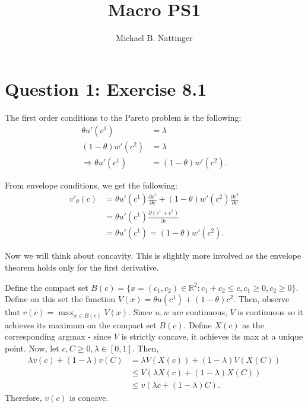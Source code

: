 \documentclass[11pt]{article} %
\title{Macro PS1}
\author{Michael B. Nattinger}
\begin{document}
\maketitle
\section{Question 1: Exercise 8.1}
The first order conditions to the Pareto problem is the following:
\begin{align*}
\theta u'(c^1) &= \lambda\\
(1-\theta)w'(c^2) &= \lambda\\
\Rightarrow \theta u'(c^1) &= (1-\theta)w'(c^2) .
\end{align*}

From envelope conditions, we get the following:
\begin{align*}
v'_{\theta}(c) &= \theta u'(c^1) \frac{\partial  c^1}{\partial c} + (1-\theta)w'(c^2)  \frac{\partial  c^2}{\partial c} \\
&= \theta u'(c^1) \frac{\partial  (c^1+c^2)}{\partial c}\\
&= \theta u'(c^1) = (1-\theta)w'(c^2) .
\end{align*}

Now we will think about concavity. This is slightly more involved as the envelope theorem holds only for the first derivative.

Define the compact set $B(c) = \{x= (c_1,c_2) \in \mathbb{R}^2: c_1+c_2\leq c, c_1\geq 0, c_2\geq 0\}$. Define on this set the function $V(x) = \theta u(c^1) + (1-\theta)c^2$. Then, observe that $v(c) = \max_{x\in B(c)}V(x)$. Since $u,w$ are continuous, $V$ is continuous so it achieves its maximum on the compact set $B(c)$. Define $X(c)$ as the corresponding argmax - since $V$ is strictly concave, it achieves its max at a unique point. Now, let $c,C \geq 0,\lambda \in [0,1]$. Then,
\begin{align*}
\lambda v(c) + (1-\lambda)v(C) &= \lambda V(X(c)) + (1-\lambda) V(X(C))\\
&\leq V(\lambda X(c) + (1-\lambda) X(C))\\
&\leq v(\lambda c + (1-\lambda) C).
\end{align*}
Therefore, $v(c)$ is concave.

%
%
\end{document}
